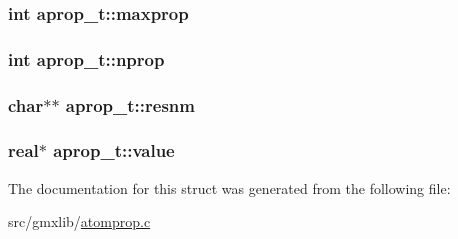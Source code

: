 \hypertarget{structaprop__t_a51a3d7a25a13871688952ed10d54f243}{
\subsubsection[{maxprop}]{\setlength{\rightskip}{0pt plus 5cm}int {\bf aprop\-\_\-t\-::maxprop}}}\label{structaprop__t_a51a3d7a25a13871688952ed10d54f243}
\hypertarget{structaprop__t_ae9cfe44d077543950d87908fe2e03106}{
\subsubsection[{nprop}]{\setlength{\rightskip}{0pt plus 5cm}int {\bf aprop\-\_\-t\-::nprop}}}\label{structaprop__t_ae9cfe44d077543950d87908fe2e03106}
\hypertarget{structaprop__t_ad8fa1dbc65a5f82d0c7b1a2c2822db00}{
\subsubsection[{resnm}]{\setlength{\rightskip}{0pt plus 5cm}char$\ast$$\ast$ {\bf aprop\-\_\-t\-::resnm}}}\label{structaprop__t_ad8fa1dbc65a5f82d0c7b1a2c2822db00}
\hypertarget{structaprop__t_ad3762650463f517a5cc3a50a89558daa}{
\subsubsection[{value}]{\setlength{\rightskip}{0pt plus 5cm}real$\ast$ {\bf aprop\-\_\-t\-::value}}}\label{structaprop__t_ad3762650463f517a5cc3a50a89558daa}


\-The documentation for this struct was generated from the following file\-:\begin{DoxyCompactItemize}
\item 
src/gmxlib/\hyperlink{atomprop_8c}{atomprop.\-c}\end{DoxyCompactItemize}

